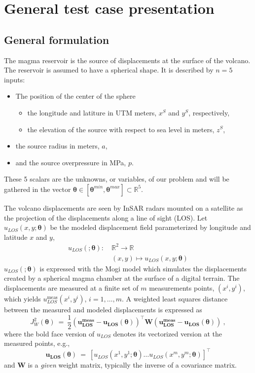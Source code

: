\documentclass[12pt]{article}
\newcommand{\enm}[1]{\ensuremath{#1}\xspace}
\newcommand{\Rset}{\enm{\mathbb{R}}}
\newcommand{\vect}[1]{\enm{\boldsymbol{\mathbf{#1}}}}
\newcommand{\mat}[1]{\enm{\boldsymbol{\mathbf{#1}}}}
\begin{document}
\section{General test case presentation}
\subsection{General formulation}
The magma reservoir is the source of displacements at the surface of the volcano. 
The reservoir is assumed to have a spherical shape. It is described by $n=5$ inputs:
\begin{itemize}
\item The position of the center of the sphere
\begin{itemize}
\item the longitude and latiture in UTM meters, $x^S$ and $y^S$, respectively,
\item the elevation of the source with respect to sea level in meters, $z^S$,
\end{itemize}
\item the source radius in meters, $a$,
\item and the source overpressure in MPa, $p$.
\end{itemize}
These 5 scalars are the unknowns, or variables, of our problem and will be gathered in the 
vector $\vect{\theta} \in [\vect{\theta}^{min} , \vect{\theta}^{max}] \subset \Rset^5$.

The volcano displacements are seen by InSAR radars mounted on a satellite as the projection of the displacements along a line of sight (LOS).
Let $u_{LOS}(x,y;\vect{\theta})$ be the modeled displacement field parameterized by longitude and latitude $x$ and $y$,
\begin{equation}
\begin{split}
u_{LOS}(;\vect{\theta}):~ & \Rset^2 \rightarrow \Rset \\
 & (x,y) \mapsto u_{LOS}(x,y;\vect{\theta})
\end{split}
\label{eq-ulos}
\end{equation}
$u_{LOS}(;\vect{\theta})$ is expressed with the Mogi model \cite{Yamakawa1955,Mogi1958} which simulates the displacements created 
by a spherical magma chamber at the surface of a digital terrain.
The displacements are measured at a finite set of $m$ measurements points, $(x^i,y^i)$, which yields $u_{LOS}^\text{meas}(x^i,y^i)$, $i=1,\ldots,m$.
A weighted least squares distance between the measured and modeled displacements is expressed as
\begin{equation}
J_W^2(\vect{\theta}) ~=~ \frac{1}{2} \left( \vect{u_{LOS}^\text{meas}} - \vect{u_{LOS}(\vect{\theta})}\right)^\top \mat{W} \left( \vect{u_{LOS}^\text{meas}} - \vect{u_{LOS}(\vect{\theta})}\right) ~,
\label{eq-wls}
\end{equation}
where the bold face version of $u_{LOS}$ denotes its vectorized version at the measured points, e.g.,
\begin{equation*}
\vect{u_{LOS}(\vect{\theta})} ~=~ \left[ u_{LOS}(x^1,y^1;\vect{\theta}) \ldots u_{LOS}(x^m,y^m;\vect{\theta}) \right]^\top
\end{equation*}
and \mat{W} is a \emph{given} weight matrix, typically the inverse of a covariance matrix.
\end{document}
